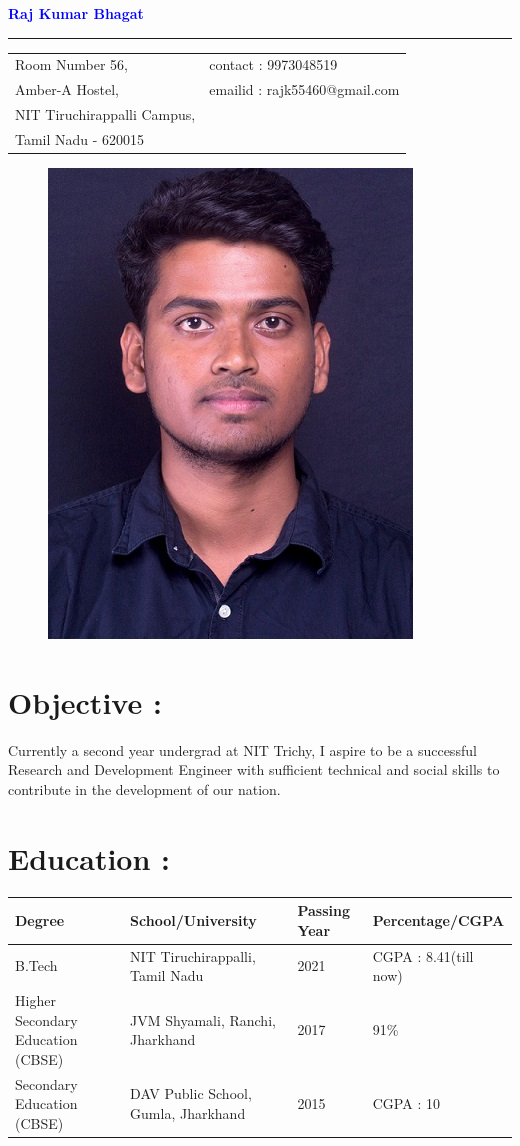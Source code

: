 \documentclass[a4paper, 12 pt]{article}
\begin{document}
\centering
{\Huge\textcolor{blue}{\bf Raj Kumar Bhagat}}\\
\rule{18cm}{0.1pt}
\begin{table}[h]
\begin{tabular}{p{11 cm}p{6cm}}
Room Number 56,& contact : 9973048519\\
Amber-A Hostel,& emailid : rajk55460@gmail.com\\
NIT Tiruchirappalli Campus,\\
Tamil Nadu - 620015
\end{tabular}
\end{table}
\begin{figure}[H]
\raggedleft
\includegraphics[scale=0.3]{Rajk0520.jpg}
\end{figure}
\raggedright
\section*{Objective :}
Currently a second year undergrad at NIT Trichy, I aspire to be a successful Research and Development Engineer with sufficient technical and social skills to contribute in the development of our nation.
\section*{Education :}
\begin{table}[h]
\begin{tabular}{|p{3.5 cm}|p{5.5cm}|p{3 cm}|p{4cm}|}
\hline
\bf Degree& \bf School/University& \bf Passing Year& \bf Percentage/CGPA\\
\hline
B.Tech&NIT Tiruchirappalli, Tamil Nadu&2021&CGPA : 8.41(till now) \\
\hline
Higher Secondary Education (CBSE)&JVM Shyamali, Ranchi, Jharkhand&2017&91\% \\
\hline
Secondary Education (CBSE)&DAV Public School, Gumla, Jharkhand &2015&CGPA : 10\\
\hline
\end{tabular}
\end{table}
\end{document}
